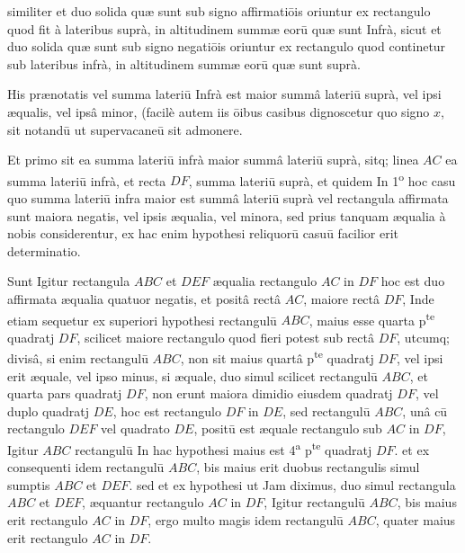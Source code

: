 \documentclass[11pt,a4paper]{article}
\begin{document}
similiter et duo solida quæ sunt sub signo affirmatiōis oriuntur ex rectangulo quod fit à lateribus suprà, in altitudinem summæ eorū quæ sunt Infrà, sicut et duo solida quæ sunt sub signo negatiōis oriuntur ex rectangulo quod continetur sub lateribus infrà, in altitudinem summæ eorū quæ sunt suprà.

His prænotatis vel summa lateriū Infrà est maior summâ lateriū suprà, vel ipsi æqualis, vel ipsâ minor, (facilè autem iis ōibus casibus dignoscetur quo signo $x$, sit notandū ut supervacaneū sit admonere.

Et primo sit ea summa lateriū infrà maior summâ lateriū suprà, sitq; linea $AC$ ea summa lateriū infrà, et recta $DF$, summa lateriū suprà, et quidem In 1\textsuperscript{o} hoc casu quo summa lateriū infra maior est summâ lateriū suprà vel rectangula affirmata sunt maiora negatis, vel ipsis æqualia, vel minora, sed prius tanquam æqualia à nobis considerentur, ex hac enim hypothesi reliquorū casuū facilior erit determinatio.

Sunt Igitur rectangula $ABC$ et $DEF$ æqualia rectangulo $AC$ in $DF$ hoc est duo affirmata æqualia quatuor negatis, et positâ rectâ $AC$, maiore rectâ $DF$, Inde etiam sequetur ex superiori hypothesi rectangulū $ABC$, maius esse quarta p\textsuperscript{te} quadratj $DF$, scilicet maiore rectangulo quod fieri potest sub rectâ $DF$, utcumq; divisâ, si enim rectangulū $ABC$, non sit maius quartâ p\textsuperscript{te} quadratj $DF$, vel ipsi erit æquale, vel ipso minus, si æquale, duo simul scilicet rectangulū $ABC$, et quarta pars quadratj $DF$, non erunt maiora dimidio eiusdem quadratj $DF$, vel duplo quadratj $DE$, hoc est rectangulo $DF$ in $DE$, sed rectangulū $ABC$, unâ cū rectangulo $DEF$ vel quadrato $DE$, positū est æquale rectangulo sub $AC$ in $DF$, Igitur $ABC$ rectangulū In hac hypothesi maius est 4\textsuperscript{a} p\textsuperscript{te} quadratj $DF$. et ex consequenti idem rectangulū $ABC$, bis maius erit duobus rectangulis simul sumptis $ABC$ et $DEF$. sed et ex hypothesi ut Jam diximus, duo simul rectangula $ABC$ et $DEF$, æquantur rectangulo $AC$ in $DF$, Igitur rectangulū $ABC$, bis maius erit rectangulo $AC$ in $DF$, ergo multo magis idem rectangulū $ABC$, quater maius erit rectangulo $AC$ in $DF$.

\end{document}

